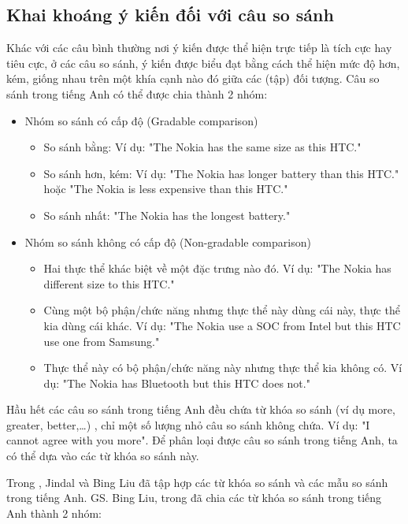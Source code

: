\documentclass[12pt]{report}
\begin{document}
			\subsection*{Khai khoáng ý kiến đối với câu so sánh}
				\label{comparative_section}
				\par Khác với các câu bình thường nơi ý kiến được thể hiện trực tiếp là tích cực hay tiêu cực, ở các câu so sánh, ý kiến được biểu đạt bằng cách thể hiện mức độ hơn, kém, giống nhau trên một khía cạnh nào đó giữa các (tập) đối tượng. Câu so sánh trong tiếng Anh có thể được chia thành 2 nhóm:
				\begin{itemize}
					\item{Nhóm so sánh có cấp độ (Gradable comparison)}	
					\begin{itemize}
						\item{So sánh bằng: Ví dụ: "The Nokia has the same size as this HTC."}					
						\item{So sánh hơn, kém: Ví dụ: "The Nokia has longer battery than this HTC."
							\\hoặc "The Nokia is less expensive than this HTC."}
						\item{So sánh nhất: "The Nokia has the longest battery."}
					\end{itemize}				
					\item{Nhóm so sánh không có cấp độ (Non-gradable comparison)
						\begin{itemize}
						\item{Hai thực thể khác biệt về một đặc trưng nào đó. Ví dụ: "The Nokia has different size to this HTC."}
						\item{Cùng một bộ phận/chức năng nhưng thực thể này dùng cái này, thực thể kia dùng cái khác. Ví dụ: "The Nokia use a SOC from Intel but this HTC use one from Samsung."}
						\item{Thực thể này có bộ phận/chức năng này nhưng thực thể kia không có. Ví dụ: "The Nokia has Bluetooth but this HTC does not."}
						\end{itemize}}					
				\end{itemize}
				\par Hầu hết các câu so sánh trong tiếng Anh đều chứa từ khóa so sánh (ví dụ more, greater, better,…) \cite{sentiment}, chỉ một số lượng nhỏ câu so sánh không chứa. Ví dụ: "I cannot agree with you more". Để phân loại được câu so sánh trong tiếng Anh, ta có thể dựa vào các từ khóa so sánh này.
				\par Trong \cite{comparative1}, Jindal và Bing Liu đã tập hợp các từ khóa so sánh và các mẫu so sánh trong tiếng Anh. GS. Bing Liu, trong \cite{sentiment} đã chia các từ khóa so sánh trong tiếng Anh thành 2 nhóm:
\end{document}
